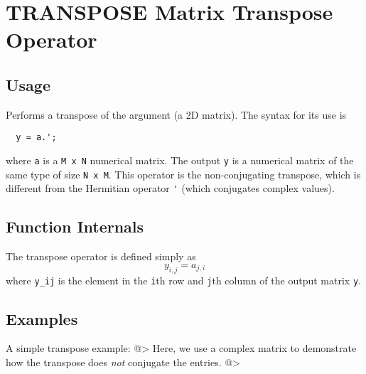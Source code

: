 \section{TRANSPOSE Matrix Transpose Operator}

\subsection{Usage}

Performs a transpose of the argument (a 2D matrix).  The syntax for its use is
\begin{verbatim}
  y = a.';
\end{verbatim}
where \verb|a| is a \verb|M x N| numerical matrix.  The output \verb|y| is a numerical matrix
of the same type of size \verb|N x M|.  This operator is the non-conjugating transpose,
which is different from the Hermitian operator \verb|'| (which conjugates complex values).
\subsection{Function Internals}

The transpose operator is defined simply as
\[
  y_{i,j} = a_{j,i}
\]
where \verb|y_ij| is the element in the \verb|i|th row and \verb|j|th column of the output matrix \verb|y|.
\subsection{Examples}

A simple transpose example:
@>
Here, we use a complex matrix to demonstrate how the transpose does \emph{not} conjugate the entries.
@>

